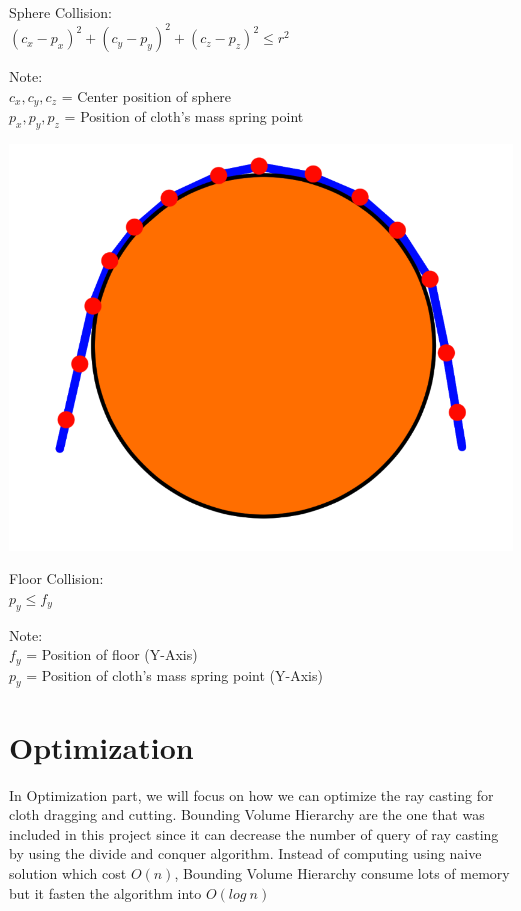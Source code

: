 \documentclass{article}
\begin{document}
\begin{multicols}{2}
\raggedright
Sphere Collision:\\ 
\centering
$(c_x - p_x)^2 + (c_y - p_y)^2 + (c_z - p_z)^2  \leq  r^2$\newline

\raggedright
Note:\\
$c_x, c_y, c_z$ = Center position of sphere\\
$p_x, p_y, p_z$ = Position of cloth's mass spring point\newline 

\centering
\includegraphics[scale = 0.25]{PointSphere}\newline

\raggedright
Floor Collision:\\
\centering
$p_y  \leq  f_y$\newline

\raggedright
Note:\\
$f_y$ = Position of floor (Y-Axis)\\
$p_y$ = Position of cloth's mass spring point (Y-Axis)\newline 

\section{Optimization}
\justify
In Optimization part, we will focus on how we can optimize the ray casting for cloth dragging and cutting. Bounding Volume Hierarchy are the one that was included in this project since it can decrease the number of query of ray casting by using the divide and conquer algorithm. 
Instead of computing using naive solution which cost $O(n)$, Bounding Volume Hierarchy consume lots of memory but it fasten the algorithm into $O(log\ n)$


\end{multicols}
\end{document}
